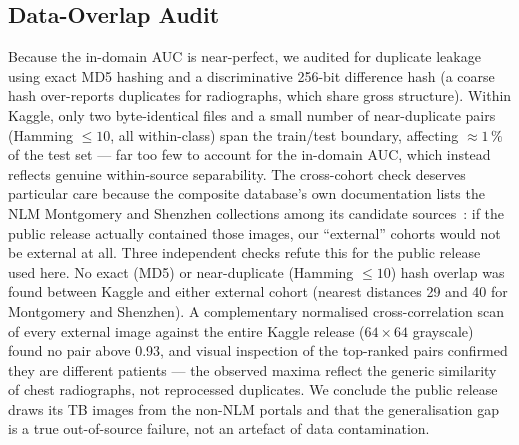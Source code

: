 \documentclass[journal]{IEEEtran}
\begin{document}
\subsection{Data-Overlap Audit}
Because the in-domain AUC is near-perfect, we audited for duplicate leakage
using exact MD5 hashing and a discriminative 256-bit difference hash (a coarse
hash over-reports duplicates for radiographs, which share gross structure).
Within Kaggle, only two byte-identical files and a small number of
near-duplicate pairs (Hamming $\leq 10$, all within-class) span the train/test
boundary, affecting ${\approx}1\,\%$ of the test set --- far too few to account
for the in-domain AUC, which instead reflects genuine within-source
separability. The cross-cohort check deserves particular care because the
composite database's own documentation lists the NLM Montgomery and Shenzhen
collections among its candidate sources~\cite{rahman2020reliable}: if the
public release actually contained those images, our ``external'' cohorts would
not be external at all. Three independent checks refute this for the public
release used here. No exact (MD5) or near-duplicate (Hamming $\leq 10$) hash
overlap was found between Kaggle and either external cohort (nearest distances
29 and 40 for Montgomery and Shenzhen). A complementary normalised
cross-correlation scan of every external image against the entire Kaggle
release ($64 \times 64$ grayscale) found no pair above 0.93, and visual
inspection of the top-ranked pairs confirmed they are different patients ---
the observed maxima reflect the generic similarity of chest radiographs, not
reprocessed duplicates. We conclude the public release draws its TB images from
the non-NLM portals and that the generalisation gap is a true out-of-source
failure, not an artefact of data contamination.
\end{document}
